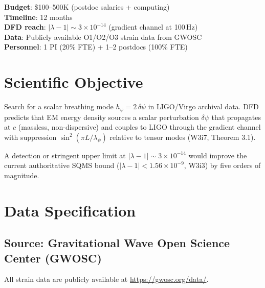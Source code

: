 \documentclass[11pt]{article}
\newcommand{\ee}[1]{\times 10^{#1}}
\newcommand{\lbone}{|\lambda - 1|}
\newcommand{\dpsi}{\delta\psi}
\begin{document}
\begin{tcolorbox}[colback=green!3!white, colframe=actioncolor,
  title=\textbf{PROPOSAL 1 --- LIGO ARCHIVAL REANALYSIS}]
\textbf{Budget}: \$100--500K (postdoc salaries + computing)\\
\textbf{Timeline}: 12 months\\
\textbf{DFD reach}: $\lbone \sim 3\ee{-14}$ (gradient channel at 100\,Hz)\\
\textbf{Data}: Publicly available O1/O2/O3 strain data from GWOSC\\
\textbf{Personnel}: 1 PI (20\% FTE) + 1--2 postdocs (100\% FTE)
\end{tcolorbox}

\section{Scientific Objective}

Search for a scalar breathing mode $h_\psi = 2\,\dpsi$ in LIGO/Virgo
archival data. DFD predicts that EM energy density sources a scalar
perturbation $\dpsi$ that propagates at $c$ (massless, non-dispersive)
and couples to LIGO through the gradient channel with suppression
$\sin^2(\pi L/\lambda_\psi)$ relative to tensor modes (W3i7, Theorem 3.1).

A detection or stringent upper limit at $\lbone \sim 3\ee{-14}$
would improve the current authoritative SQMS bound
($\lbone < 1.56\ee{-9}$, W3i3) by five orders of magnitude.

\section{Data Specification}

\subsection{Source: Gravitational Wave Open Science Center (GWOSC)}

All strain data are publicly available at \url{https://gwosc.org/data/}.
\end{document}
